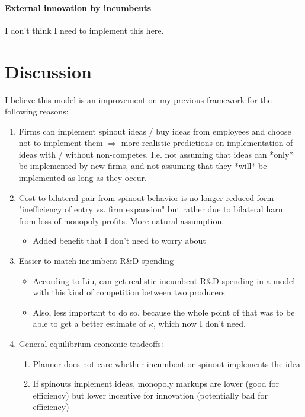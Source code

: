 \documentclass[12pt,english]{article}
\theoremstyle{remark}
\begin{document}
\paragraph{External innovation by incumbents}

I don't think I need to implement this here.

\section{Discussion}

I believe this model is an improvement on my previous framework for the following reasons:

\begin{enumerate}
	\item Firms can implement spinout ideas / buy ideas from employees and choose not to implement them $\Rightarrow$ more realistic predictions on implementation of ideas with / without non-competes. I.e. not assuming that ideas can *only* be implemented by new firms, and not assuming that they *will* be implemented as long as they occur. 
	\item Cost to bilateral pair from spinout behavior is no longer reduced form "inefficiency of entry vs. firm expansion" but rather due to bilateral harm from loss of monopoly profits. More natural assumption.
	\begin{itemize}
		\item Added benefit that I don't need to worry about 
	\end{itemize}
	\item Easier to match incumbent R\&D spending
	\begin{itemize}
		\item According to Liu, can get realistic incumbent R\&D spending in a model with this kind of competition between two producers
		\item Also, less important to do so, because the whole point of that was to be able to get a better estimate of $\kappa$, which now I don't need.
	\end{itemize}
	\item General equilibrium economic tradeoffs:
	\begin{enumerate}
		\item Planner does not care whether incumbent or spinout implements the idea
		\item If spinouts implement ideas, monopoly markups are lower (good for efficiency) but lower incentive for innovation (potentially bad for efficiency)

\end{enumerate}
\end{enumerate}
\end{document}
